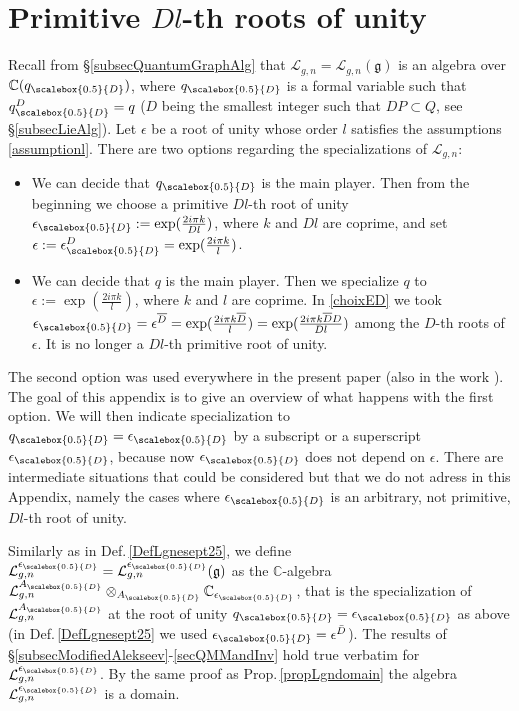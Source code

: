 \documentclass[11pt]{amsart}
\newcommand{\e}{\epsilon}
\newcommand{\qD}{q_{\scalebox{0.5}{D}}}
\newcommand{\eD}{\epsilon_{\scalebox{0.5}{D}}}
\newcommand{\AD}{A_{\scalebox{0.5}{D}}}
\begin{document}
\section{Primitive \texorpdfstring{$Dl$-th}{ } roots of unity}\label{appDlRoot} Recall from \S\ref{subsecQuantumGraphAlg} that $\mathcal{L}_{g,n} = \mathcal{L}_{g,n}(\mathfrak{g})$ is an algebra over $\mathbb{C}(\qD)$, where $\qD$ is a formal variable such that $\qD^D = q$ ($D$ being the smallest integer such that $DP \subset Q$, see \S\ref{subsecLieAlg}). Let $\epsilon$ be a root of unity whose order $l$ satisfies the assumptions \eqref{assumptionl}. There are two options regarding the specializations of $\mathcal{L}_{g,n}$:
\begin{itemize}
\item We can decide that $\qD$ is the main player. Then from the beginning we choose a primitive $Dl$-th root of unity $\textstyle \eD:= \exp(\frac{2i\pi k}{Dl})$, where $k$ and $Dl$ are coprime, and set $\textstyle \e := \eD^D = \exp(\frac{2i\pi k}{l})$.
\item We can decide that $q$ is the main player. Then we specialize $q$ to $\textstyle \e:= \exp(\frac{2i\pi k}{l})$, where $k$ and $l$ are coprime. In \eqref{choixED} we took $\eD=\e^{\overline{D}} = \textstyle \exp(\frac{2i\pi k \overline{D}}{l}) = \exp(\frac{2i\pi k \overline{D}D}{Dl})$ among the $D$-th roots of $\e$. It is no longer a $Dl$-th primitive root of unity.

\end{itemize}
The second option was used everywhere in the present paper (also in the work \cite{GJS}). The goal of this appendix is to give an overview of what happens with the first option. We will then indicate specialization to $\qD = \eD$ by a subscript or a superscript $\eD$, because now $\eD$ does not depend on $\e$. There are intermediate situations that could be considered but that we do not adress in this Appendix, namely the cases where $\eD$ is an arbitrary, not primitive, $Dl$-th root of unity.
\smallskip

Similarly as in Def.\,\ref{DefLgnesept25}, we define $\mathcal{L}_{g,n}^{\eD}= \mathcal{L}_{g,n}^{\eD}(\mathfrak{g})$ as the $\mathbb{C}$-algebra $\mathcal{L}_{g,n}^{\AD} \otimes_{\AD} \mathbb{C}_{\eD}$, that is the specialization of $\mathcal{L}_{g,n}^{\AD}$ at the root of unity $\qD = \eD$ as above (in Def.\,\ref{DefLgnesept25} we used $\eD= \e^{\bar{D}}$). The results of \S \ref{subsecModifiedAlekseev}-\ref{secQMMandInv} hold true verbatim for $\mathcal{L}_{g,n}^{\eD}$. By the same proof as Prop.\,\ref{propLgndomain} the algebra $\mathcal{L}_{g,n}^{\eD}$ is a domain.
\end{document}
